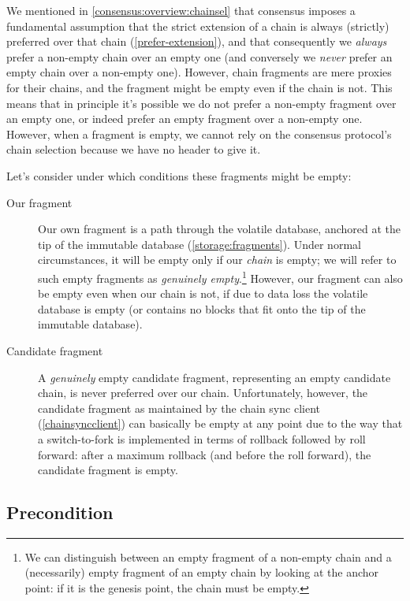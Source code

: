 We mentioned in \cref{consensus:overview:chainsel} that consensus imposes a
fundamental assumption that the strict extension of a chain is always (strictly)
preferred over that chain (\cref{prefer-extension}), and that consequently we
\emph{always} prefer a non-empty chain over an empty one (and conversely we
\emph{never} prefer an empty chain over a non-empty one). However, chain
fragments are mere proxies for their chains, and the fragment might be empty
even if the chain is not. This means that in principle it's possible we do not
prefer a non-empty fragment over an empty one, or indeed prefer an empty
fragment over a non-empty one. However, when a fragment is empty, we cannot rely
on the consensus protocol's chain selection because we have no header to give
it.

Let's consider under which conditions these fragments might be empty:

\begin{description}
\item[Our fragment]
Our own fragment is a path through the volatile database, anchored at the tip of
the immutable database (\cref{storage:fragments}). Under normal circumstances,
it will be empty only if our \emph{chain} is empty; we will refer to such empty
fragments as \emph{genuinely empty}.\footnote{We can distinguish between an empty
fragment of a non-empty chain and a (necessarily) empty fragment of an empty
chain by looking at the anchor point: if it is the genesis point, the chain must
be empty.} However, our fragment can also be empty even when our chain is not,
if due to data loss the volatile database is empty (or contains no blocks that
fit onto the tip of the immutable database).

\item[Candidate fragment]
A \emph{genuinely} empty candidate fragment, representing an empty candidate
chain, is never preferred over our chain. Unfortunately, however, the candidate
fragment as maintained by the chain sync client (\cref{chainsyncclient}) can
basically be empty at any point due to the way that a switch-to-fork is
implemented in terms of rollback followed by roll forward: after a maximum
rollback (and before the roll forward), the candidate fragment is empty.
\end{description}

\subsection{Precondition}
\label{chainsel:fragments:precondition}

